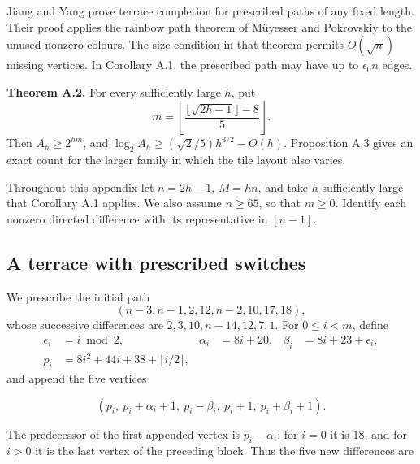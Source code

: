 \documentclass[11pt,a4paper]{article}
\newcommand{\statementstart}{\par\addvspace{6pt plus 1pt minus 1pt}\noindent}
\begin{document}
Jiang and Yang \cite[Corollary 8.1]{JY26} prove terrace completion for prescribed paths of any fixed length. Their proof applies the rainbow path theorem of Müyesser and Pokrovskiy \cite[Theorem 6.9]{MP25} to the unused nonzero colours. The size condition in that theorem permits \(O(\sqrt n)\) missing vertices. In Corollary A.1, the prescribed path may have up to \(\epsilon_0 n\) edges.

\statementstart\textbf{Theorem A.2.} For every sufficiently large \(h\), put \[
 m=\left\lfloor\frac{\lfloor\sqrt{2h-1}\rfloor-8}{5}\right\rfloor.
\] Then \(A_h\geq2^{hm}\), and \(\log_2 A_h\geq(\sqrt2/5)h^{3/2}-O(h)\). Proposition A.3 gives an exact count for the larger family in which the tile layout also varies.

Throughout this appendix let \(n=2h-1\), \(M=hn\), and take \(h\) sufficiently large that Corollary A.1 applies. We also assume \(n\geq65\), so that \(m\geq0\). Identify each nonzero directed difference with its representative in \([n-1]\).

\hypertarget{a-terrace-with-prescribed-switches}{%
\subsection{A terrace with prescribed switches}\label{a-terrace-with-prescribed-switches}}

We prescribe the initial path \begin{equation}
(n-3,n-1,2,12,n-2,10,17,18),
\tag{A1}\label{eq:A1}
\end{equation} whose successive differences are \(2,3,10,n-14,12,7,1\). For \(0\leq i<m\), define \begin{equation}
\begin{aligned}
 \epsilon_i&=i\bmod2,&
 \alpha_i&=8i+20,&
 \beta_i&=8i+23+\epsilon_i,\\
 p_i&=8i^2+44i+38+\lfloor i/2\rfloor,
\end{aligned}
\tag{A2}\label{eq:A2}
\end{equation} and append the five vertices

\begin{equation}
(p_i,\ p_i+\alpha_i+1,\ p_i-\beta_i,\
   p_i+1,\ p_i+\beta_i+1).
\tag{A3}\label{eq:A3}
\end{equation}

The predecessor of the first appended vertex is \(p_i-\alpha_i\): for \(i=0\) it is \(18\), and for \(i>0\) it is the last vertex of the preceding block. Thus the five new differences are
\end{document}
